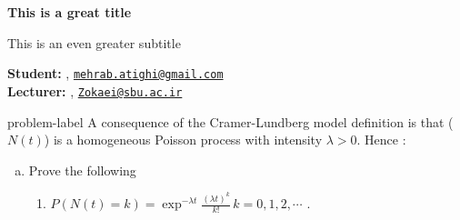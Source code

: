 





	
	\begin{Large}
		\textsf{\textbf{This is a great title}}
		
		This is an even greater subtitle
	\end{Large}
	
	\vspace{1ex}
	
	\textsf{\textbf{Student:}} , \href{mailto:mehrab.atighi@gmail.com}{\texttt{mehrab.atighi@gmail.com}}\\
	\textsf{\textbf{Lecturer:}} , \href{mailto:Zokaei@sbu.ac.ir}{\texttt{Zokaei@sbu.ac.ir}}
	
	
	\vspace{2ex}
	
	\begin{problem}{}{problem-label}
		A consequence of the Cramer-Lundberg model definition is that ($N(t)$) is a homogeneous Poisson process with intensity $\lambda > 0$. Hence \cite{Embrechts.etal1997}:
		
		\begin{enumerate}[(a)]
			\item Prove the following
			\begin{enumerate}[label = (\roman*)]
				\item $P(N(t) =k) = \exp^{-\lambda t} \frac{(\lambda t)^k}{k!} \, k = 0,1,2,\cdots$ .
			\end{enumerate}
		\end{enumerate}
	\end{problem}
	
